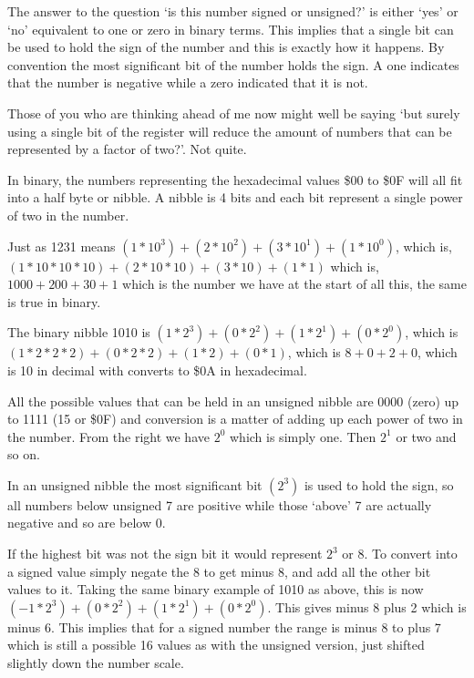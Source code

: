 The answer to the question `is this number signed or unsigned?' is
    either `yes' or `no' equivalent to one or zero in binary terms. This
    implies that a single bit can be used to hold the sign of the number and
    this is exactly how it happens. By convention the most significant bit of
    the number holds the sign. A one indicates that the number is negative
    while a zero indicated that it is not.

Those of you who are thinking ahead of me now might well be saying
    `but surely using a single bit of the register will reduce the amount of
    numbers that can be represented by a factor of two?'. Not quite.

In binary, the numbers representing the hexadecimal values \$00 to
    \$0F will all fit into a half byte or nibble. A nibble is 4 bits and each
    bit represent a single power of two in the number.

Just as 1231 means $(1 * 10^{3}) + (2 * 10^{2}) + (3 * 10^{1}) + (1 * 10^{0})$, which is, $(1 * 10 * 10 * 10) + (2 * 10 * 10) + (3 * 10) + (1 * 1)$
    which is, $1000 + 200 + 30 + 1$ which is the number we have at the start of
    all this, the same is true in binary.

The binary nibble 1010 is $(1 * 2^{3}) + (0 * 2^{2}) + (1 * 2^{1}) + (0 * 2^{0})$, which is $(1 * 2 * 2 * 2) + (0 * 2 * 2) + (1 * 2) + (0 * 1)$, which is
    $8 + 0 + 2 + 0$, which is 10 in decimal with converts to \$0A in hexadecimal.

All the possible values that can be held in an unsigned nibble are
    0000 (zero) up to 1111 (15 or \$0F) and conversion is a matter of adding up
    each power of two in the number. From the right we have $2^{0}$ which is simply one. Then $2^{1}$ or two and so on.

In an unsigned nibble the most significant bit $(2^{3})$ is used to hold
    the sign, so all numbers below unsigned 7 are positive while those `above' 7 are actually negative and so are below 0.

If the highest bit was not the sign bit it would represent $2^{3}$ or 8.
    To convert into a signed value simply negate the 8 to get minus 8, and add
    all the other bit values to it. Taking the same binary example of 1010 as
    above, this is now
$(-{}1 * 2^{3}) + (0 * 2^{2}) + (1 * 2^{1}) + (0 * 2^{0})$. This 
    gives minus 8 plus 2 which is minus 6. This implies that for a signed
    number the range is minus 8 to plus 7 which is still a possible 16 values as with
    the unsigned version, just shifted slightly down the number scale.

